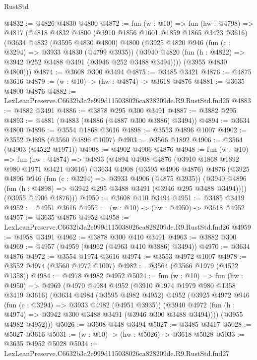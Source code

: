 \begin{lexlean}{RustStd}
\begin{coremodule}
@4832 := @4826 @4830 @4800
@4872 := fun (w : @10) =>
  fun (hw : @4798) =>
  @4817
    (@4818
      @4832
      @4800
      (@3910 @1856 @1601 @1859 @1865 @3423 @3616)
      (@3634
        @4832
        (@3595 @4830 @4800)
        @4800
        (@3925
          @4820
          @946
          (fun (c : @3294) => @3933 @4830 (@4799 @3935))
          (@3940 @4820 (fun (h : @4822) => @3942 @252 @3488 @3491 (@3946 @252 @3488 @3494))))
        (@3955 @4830 @4800)))
@4874 := @3608 @300 @3494
@4875 := @3485 @3421
@4876 := @4875 @3616
@4879 := (w : @10) -> (hw : @4874) -> @3618 @4876
@4881 := @3635 @4800 @4876
@4882 := LexLeanPreserve.C6632b3a2e999d115038026ca828209de.R9.RustStd.fnd25
@4883 := @4882 @3491
@4886 := @3878 @295 @300 @3491
@4887 := @3882 @295
@4893 := @4881 (@4883 (@4886 (@4887 @300 @3886) @3494))
@4894 := @3634 @4800
@4896 := @3554 @1868 @3616
@4898 := @3553 @4896 @1007
@4902 := @3552 @4898 (@3560 @4896 @1007)
@4903 := @3566 @1892
@4906 := @3564 (@4903 (@4522 @1971))
@4908 := @4902 @4906 @4876
@4948 := fun (w : @10) =>
  fun (hw : @4874) =>
  @4893
    (@4894
      @4908
      @4876
      (@3910 @1868 @1892 @980 @1971 @3421 @3616)
      (@3634
        @4908
        (@3595 @4906 @4876)
        @4876
        (@3925
          @4896
          @946
          (fun (c : @3294) => @3933 @4906 (@4875 @3935))
          (@3940 @4896 (fun (h : @4898) => @3942 @295 @3488 @3491 (@3946 @295 @3488 @3494))))
        (@3955 @4906 @4876)))
@4950 := @3608 @410 @3494
@4951 := @3485 @3419
@4952 := @4951 @3616
@4955 := (w : @10) -> (hw : @4950) -> @3618 @4952
@4957 := @3635 @4876 @4952
@4958 := LexLeanPreserve.C6632b3a2e999d115038026ca828209de.R9.RustStd.fnd26
@4959 := @4958 @3491
@4962 := @3878 @300 @410 @3491
@4963 := @3882 @300
@4969 := @4957 (@4959 (@4962 (@4963 @410 @3886) @3494))
@4970 := @3634 @4876
@4972 := @3554 @1974 @3616
@4974 := @3553 @4972 @1007
@4978 := @3552 @4974 (@3560 @4972 @1007)
@4982 := @3564 (@3566 @1979 (@4522 @1358))
@4984 := @4978 @4982 @4952
@5024 := fun (w : @10) =>
  fun (hw : @4950) =>
  @4969
    (@4970
      @4984
      @4952
      (@3910 @1974 @1979 @980 @1358 @3419 @3616)
      (@3634
        @4984
        (@3595 @4982 @4952)
        @4952
        (@3925
          @4972
          @946
          (fun (c : @3294) => @3933 @4982 (@4951 @3935))
          (@3940 @4972 (fun (h : @4974) => @3942 @300 @3488 @3491 (@3946 @300 @3488 @3494))))
        (@3955 @4982 @4952)))
@5026 := @3608 @448 @3494
@5027 := @3485 @3417
@5028 := @5027 @3616
@5031 := (w : @10) -> (hw : @5026) -> @3618 @5028
@5033 := @3635 @4952 @5028
@5034 := LexLeanPreserve.C6632b3a2e999d115038026ca828209de.R9.RustStd.fnd27

\end{coremodule}
\end{lexlean}
